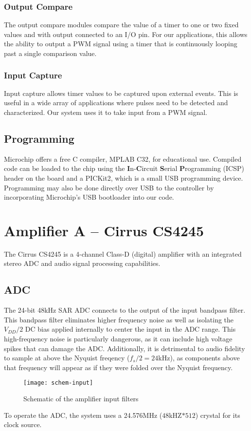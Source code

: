 \subsubsection{Output Compare}
The output compare modules compare the value of a timer to one or two fixed values and with output connected to an I/O pin. For our applications, this allows the ability to output a PWM signal using a timer that is continuously looping past a single comparison value.
\subsubsection{Input Capture}
Input capture allows timer values to be captured upon external events. This is useful in a wide array of applications where pulses need to be detected and characterized. Our system uses it to take input from a PWM signal.

\subsection{Programming}
Microchip offers a free C compiler, MPLAB C32, for educational use. Compiled code can be loaded to the chip using the \textbf{I}n-\textbf{C}ircuit \textbf{S}erial \textbf{P}rogramming (ICSP) header on the board and a PICKit2, which is a small USB programming device. Programming may also be done directly over USB to the controller by incorporating Microchip's USB bootloader into our code.

\section{Amplifier A -- Cirrus CS4245}
\label{sec:cs4525}
The Cirrus CS4245 is a 4-channel Class-D (digital) amplifier with an integrated stereo ADC and audio signal processing capabilities.
\subsection{ADC}
\label{sec:cs4525-adc}
The 24-bit 48kHz SAR ADC connects to the output of the input bandpass filter. This bandpass filter eliminates higher frequency noise as well as isolating the $V_{DD}/2$ DC bias applied internally to center the input in the ADC range. This high-frequency noise is particularly dangerous, as it can include high voltage spikes that can damage the ADC. Additionally, it is detrimental to audio fidelity to sample at above the Nyquist freqency ($f_s/2 = 24$kHz), as components above that frequency will appear as if they were folded over the Nyquist frequency.
\begin{figure}[H]
	\centering
	\texttt{[image: schem-input]}
	\caption[Schematic -- Analog Input Filtering]%
	{Schematic of the amplifier input filters}
\end{figure}
To operate the ADC, the system uses a 24.576MHz ($48$kHZ$*512$) crystal for its clock source.

